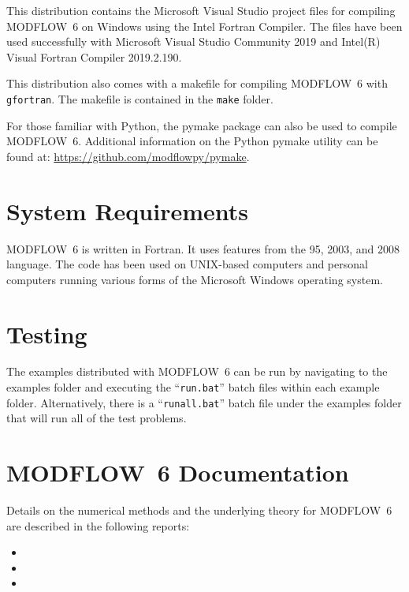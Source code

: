 \documentclass[11pt,twoside,twocolumn]{usgsreport}
\begin{document}
This distribution contains the Microsoft Visual Studio project files for compiling MODFLOW~6 on Windows using the Intel Fortran Compiler.  The files have been used successfully with Microsoft Visual Studio Community 2019 and Intel(R) Visual Fortran Compiler 2019.2.190.

This distribution also comes with a makefile for compiling MODFLOW~6 with \texttt{gfortran}.  The makefile is contained in the \texttt{make} folder.

For those familiar with Python, the pymake package can also be used to compile MODFLOW~6.  Additional information on the Python pymake utility can be found at: \url{https://github.com/modflowpy/pymake}.  

\section{System Requirements}
MODFLOW~6 is written in Fortran.  It uses features from the 95, 2003, and 2008 language.  The code has been used on UNIX-based computers and personal computers running various forms of the Microsoft Windows operating system.

\section{Testing}
The examples distributed with MODFLOW~6 can be run by navigating to the examples folder and executing the ``\texttt{run.bat}'' batch files within each example folder.  Alternatively, there is a ``\texttt{runall.bat}'' batch file under the examples folder that will run all of the test problems.

\section{MODFLOW~6 Documentation}
Details on the numerical methods and the underlying theory for MODFLOW~6 are described in the following reports:

\begin{itemize}

\item {}

\item {}

\item {}

\end{itemize}
 
\end{document}
